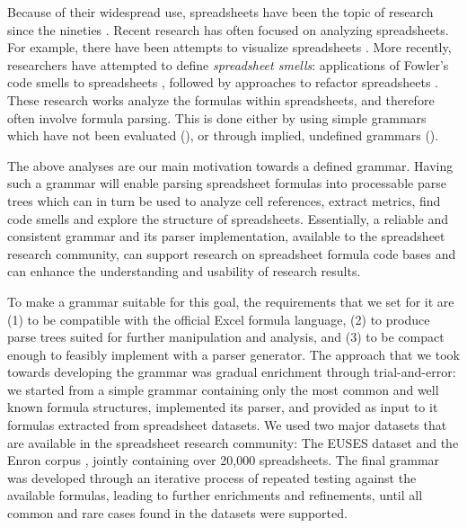 \documentclass[conference]{IEEEtran}
\begin{document}
Because of their widespread use, spreadsheets have been the topic of research since the nineties \cite{DBLP:journals/sigplan/BellP93}. Recent research has often focused on analyzing spreadsheets. For example, there have been attempts to visualize spreadsheets \cite{DBLP:conf/icse/HermansPD11, Shio1999}. More recently, researchers have attempted to define \emph{spreadsheet smells}: applications of Fowler's code smells to spreadsheets \cite{DBLP:conf/icse/HermansPD12, DBLP:conf/icsm/Hermans212}, followed by approaches to refactor spreadsheets \cite{hermans2014bumblebee,badame2012refactoring}. These research works analyze the formulas within spreadsheets, and therefore often involve formula parsing. This is done either by using simple grammars which have not been evaluated (\cite{badame2012refactoring}), or through implied, undefined grammars (\cite{DBLP:conf/icse/HermansPD11,DBLP:conf/icse/HermansPD12, DBLP:conf/icsm/Hermans212, hermans2014bumblebee}). 

The above analyses are our main motivation towards a defined grammar. Having such a grammar will enable parsing spreadsheet formulas into processable parse trees which can in turn be used to analyze cell references, extract metrics, find code smells and explore the structure of spreadsheets. Essentially, a reliable and consistent grammar and its parser implementation, available to the spreadsheet research community, can support research on spreadsheet formula code bases and can enhance the understanding and usability of research results.

To make a grammar suitable for this goal, the requirements that we set for it are (1) to be compatible with the official Excel formula language, (2) to produce parse trees suited for further manipulation and analysis, and (3) to be compact enough to feasibly implement with a parser generator. The approach that we took towards developing the grammar was gradual enrichment through trial-and-error: we started from a simple grammar containing only the most common and well known formula structures, implemented its parser, and provided as input to it formulas extracted from spreadsheet datasets. We used two major datasets that are available in the spreadsheet research community: The EUSES dataset \cite{euses} and the Enron corpus \cite{enron}, jointly containing over 20,000 spreadsheets. The final grammar was developed through an iterative process of repeated testing against the available formulas, leading to further enrichments and refinements, until all common and rare cases found in the datasets were supported.
\end{document}
